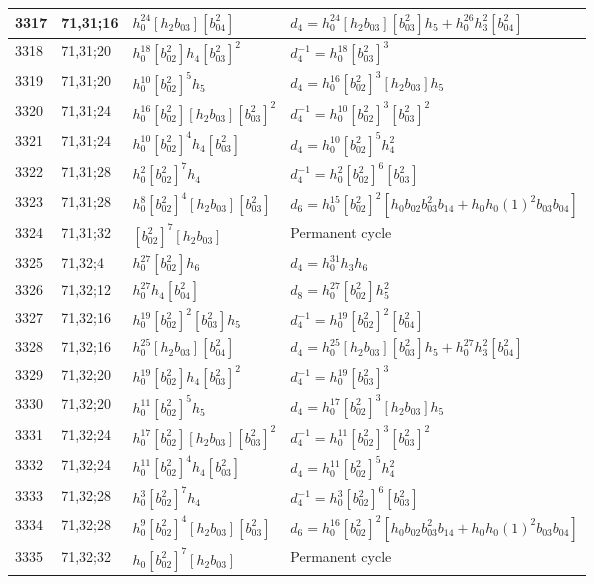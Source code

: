 \documentclass{article}
\begin{document}
\begin{longtable}{|l|l|>{\raggedright\arraybackslash}p{6cm}|>{\raggedright\arraybackslash}p{6cm}|}
3317 & 71,31;16 & $h_0^{24}[h_2b_{03}][b_{04}^2]$ &$d_{4}=h_0^{24}[h_2b_{03}][b_{03}^2]h_5 + h_0^{26}h_3^2[b_{04}^2]$\\
\hline
3318 & 71,31;20 & $h_0^{18}[b_{02}^2]h_4[b_{03}^2]^2$ & $d_{4}^{-1}=h_0^{18}[b_{03}^2]^3$\\
3319 & 71,31;20 & $h_0^{10}[b_{02}^2]^5h_5$ &$d_{4}=h_0^{16}[b_{02}^2]^3[h_2b_{03}]h_5$\\
\hline
3320 & 71,31;24 & $h_0^{16}[b_{02}^2][h_2b_{03}][b_{03}^2]^2$ & $d_{4}^{-1}=h_0^{10}[b_{02}^2]^3[b_{03}^2]^2$\\
3321 & 71,31;24 & $h_0^{10}[b_{02}^2]^4h_4[b_{03}^2]$ &$d_{4}=h_0^{10}[b_{02}^2]^5h_4^2$\\
\hline
3322 & 71,31;28 & $h_0^2[b_{02}^2]^7h_4$ & $d_{4}^{-1}=h_0^2[b_{02}^2]^6[b_{03}^2]$\\
3323 & 71,31;28 & $h_0^8[b_{02}^2]^4[h_2b_{03}][b_{03}^2]$ &$d_{6}=h_0^{15}[b_{02}^2]^2[h_0b_{02}b_{03}^2b_{14} + h_0h_0(1)^2b_{03}b_{04}]$\\
\hline
3324 & 71,31;32 & $[b_{02}^2]^7[h_2b_{03}]$ & Permanent cycle\\
\hline
3325 & 71,32;4 & $h_0^{27}[b_{02}^2]h_6$ &$d_{4}=h_0^{31}h_3h_6$\\
\hline
3326 & 71,32;12 & $h_0^{27}h_4[b_{04}^2]$ &$d_{8}=h_0^{27}[b_{02}^2]h_5^2$\\
\hline
3327 & 71,32;16 & $h_0^{19}[b_{02}^2]^2[b_{03}^2]h_5$ & $d_{4}^{-1}=h_0^{19}[b_{02}^2]^2[b_{04}^2]$\\
3328 & 71,32;16 & $h_0^{25}[h_2b_{03}][b_{04}^2]$ &$d_{4}=h_0^{25}[h_2b_{03}][b_{03}^2]h_5 + h_0^{27}h_3^2[b_{04}^2]$\\
\hline
3329 & 71,32;20 & $h_0^{19}[b_{02}^2]h_4[b_{03}^2]^2$ & $d_{4}^{-1}=h_0^{19}[b_{03}^2]^3$\\
3330 & 71,32;20 & $h_0^{11}[b_{02}^2]^5h_5$ &$d_{4}=h_0^{17}[b_{02}^2]^3[h_2b_{03}]h_5$\\
\hline
3331 & 71,32;24 & $h_0^{17}[b_{02}^2][h_2b_{03}][b_{03}^2]^2$ & $d_{4}^{-1}=h_0^{11}[b_{02}^2]^3[b_{03}^2]^2$\\
3332 & 71,32;24 & $h_0^{11}[b_{02}^2]^4h_4[b_{03}^2]$ &$d_{4}=h_0^{11}[b_{02}^2]^5h_4^2$\\
\hline
3333 & 71,32;28 & $h_0^3[b_{02}^2]^7h_4$ & $d_{4}^{-1}=h_0^3[b_{02}^2]^6[b_{03}^2]$\\
3334 & 71,32;28 & $h_0^9[b_{02}^2]^4[h_2b_{03}][b_{03}^2]$ &$d_{6}=h_0^{16}[b_{02}^2]^2[h_0b_{02}b_{03}^2b_{14} + h_0h_0(1)^2b_{03}b_{04}]$\\
\hline
3335 & 71,32;32 & $h_0[b_{02}^2]^7[h_2b_{03}]$ & Permanent cycle\\

\end{longtable}
\end{document}
